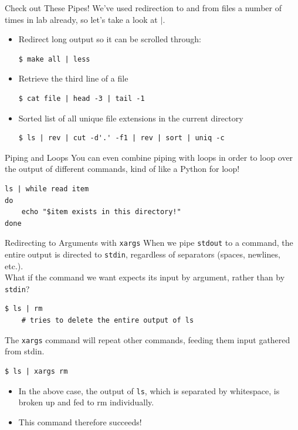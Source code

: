 \documentclass[11pt]{beamer}
\begin{document}
\begin{frame}[fragile=singleslide]{Check out These Pipes!}
We've used redirection to and from files a number of times in lab already, so let's take a look at $|$.
\begin{itemize}
\item Redirect long output so it can be scrolled through: 
\begin{lstlisting}[style=terminal]
$ make all | less
\end{lstlisting}
\item Retrieve the third line of a file
\begin{lstlisting}[style=terminal]
$ cat file | head -3 | tail -1
\end{lstlisting}
\item Sorted list of all unique file extensions in the current directory
\begin{lstlisting}[style=terminal]
$ ls | rev | cut -d'.' -f1 | rev | sort | uniq -c
\end{lstlisting}
\end{itemize}
\end{frame}

\begin{frame}[fragile=singleslide]{Piping and Loops}
You can even combine piping with loops in order to loop over the output of different commands, kind of like a Python for loop! 
\begin{lstlisting}[style=terminal]
ls | while read item
do
	echo "$item exists in this directory!"
done 
\end{lstlisting}
\end{frame}

\begin{frame}[fragile=singleslide]{Redirecting to Arguments with \texttt{xargs}}
When we pipe \texttt{stdout} to a command, the entire output is directed to \texttt{stdin}, regardless of separators (spaces, newlines, etc.). \\
\vspace{0.5em}
What if the command we want expects its input by argument, rather than by \texttt{stdin}?

\begin{lstlisting}[style=terminal]
$ ls | rm
	# tries to delete the entire output of ls
\end{lstlisting}

The \texttt{xargs} command will repeat other commands, feeding them input gathered from stdin.

\begin{lstlisting}[style=terminal]
$ ls | xargs rm
\end{lstlisting}
\begin{itemize}
\item In the above case, the output of \texttt{ls}, which is separated by whitespace, is broken up and fed to rm individually. 
\item This command therefore succeeds!
\end{itemize}
\end{frame}
\end{document}
